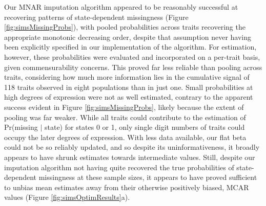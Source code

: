 \documentclass[10pt, twocolumn, twoside]{article}
\begin{document}
Our MNAR imputation algorithm appeared to be reasonably successful at recovering patterns of state-dependent missingness (Figure \ref{fig:simsMissingProbs}), with pooled probabilities across traits recovering the appropriate monotonic decreasing order, despite that assumption never having been explicitly specified in our implementation of the algorithm. For estimation, however, these probabilities were evaluated and incorporated on a per-trait basis, given commensurability concerns. This proved far less reliable than pooling across traits, considering how much more information lies in the cumulative signal of 118 traits observed in eight populations than in just one. Small probabilities at high degrees of expression were not as well estimated, contrary to the apparent success evident in Figure \ref{fig:simsMissingProbs}, likely because the extent of pooling was far weaker. While all traits could contribute to the estimation of Pr(missing $\vert$ state) for states 0 or 1, only single digit numbers of traits could occupy the later degrees of expression. With less data available, our flat beta could not be so reliably updated, and so despite its uninformativeness, it broadly appears to have shrunk estimates towards intermediate values. Still, despite our imputation algorithm not having quite recovered the true probabilities of state-dependent missingness at these sample sizes, it appears to have proved sufficient to unbias mean estimates away from their otherwise positively biased, MCAR values (Figure \ref{fig:simsOptimResults}a).
\end{document}
